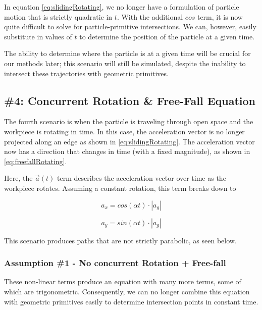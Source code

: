 In equation \eqref{eq:slidingRotating}, we no longer have a formulation of particle motion that is strictly quadratic in $t$. With the additional $cos$ term, it is now quite difficult to solve for particle-primitive intersections. We can, however, easily substitute in values of $t$ to determine the position of the particle at a given time.

The ability to determine where the particle is at a given time will be crucial for our methods later; this scenario will still be simulated, despite the inability to intersect these trajectories with geometric primitives.

		\subsection{\#4: Concurrent Rotation \& Free-Fall Equation}

The fourth scenario is when the particle is traveling through open space and the workpiece is rotating in time. In this case, the acceleration vector is no longer projected along an edge as shown in \eqref{eq:slidingRotating}. The acceleration vector now has a direction that changes in time (with a fixed magnitude), as shown in \eqref{eq:freefallRotating}.

 {
	\label{eq:freefallRotating}
}

Here, the $\vec{a}(t)$ term describes the acceleration vector over time as the workpiece rotates. Assuming a constant rotation, this term breaks down to

$$
a_x = cos(\alpha t) \cdot |a_g|
$$

$$
a_y = sin(\alpha t) \cdot |a_g|
$$

This scenario produces paths that are not strictly parabolic, as seen below.


		\subsubsection{Assumption \#1 - No concurrent Rotation + Free-fall}

These non-linear terms produce an equation with many more terms, some of which are trigonometric. Consequently, we can no longer combine this equation with geometric primitives easily to determine intersection points in constant time.

